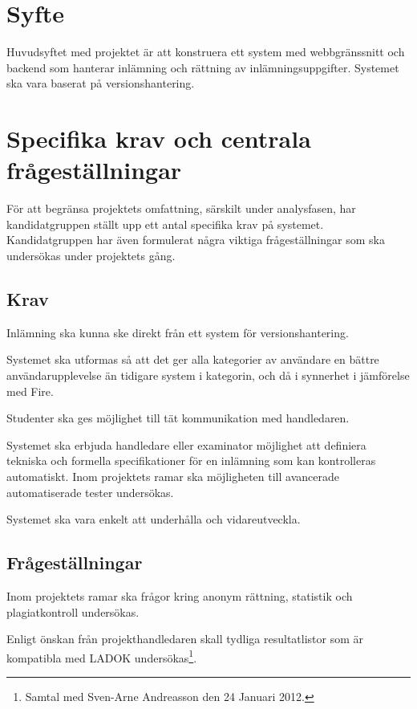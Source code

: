 \section{Syfte}

Huvudsyftet med projektet är att konstruera ett system med webbgränssnitt och
backend som hanterar inlämning och rättning av inlämningsuppgifter. Systemet ska
vara baserat på versionshantering.

\section{Specifika krav och centrala frågeställningar}

För att begränsa projektets omfattning, särskilt under analysfasen, har kandidatgruppen
ställt upp ett antal specifika krav på systemet.
Kandidatgruppen har även formulerat några viktiga frågeställningar som ska undersökas under projektets gång.

\subsection{Krav}

Inlämning ska kunna ske direkt från ett system för versionshantering. 

Systemet ska utformas så att det ger alla kategorier av användare en bättre användarupplevelse än 
tidigare system i kategorin, och då i synnerhet i jämförelse med Fire.

Studenter ska ges möjlighet till tät kommunikation med handledaren.

Systemet ska erbjuda handledare eller examinator möjlighet att definiera tekniska och formella specifikationer för en inlämning som kan kontrolleras automatiskt. Inom projektets ramar ska möjligheten till avancerade automatiserade tester undersökas.

Systemet ska vara enkelt att underhålla och vidareutveckla.

\subsection{Frågeställningar}

Inom projektets ramar ska frågor kring anonym rättning, statistik och plagiatkontroll undersökas.

Enligt önskan från projekthandledaren skall tydliga resultatlistor som är kompatibla med LADOK undersökas\footnote{Samtal med Sven-Arne Andreasson den 24 Januari 2012.}.

